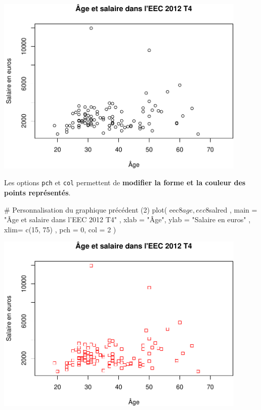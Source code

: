 \documentclass[12pt,twosided, notitlepage]{book}
\newenvironment{Shaded}{}{}
\newcommand{\KeywordTok}[1]{\textcolor[rgb]{0.00,0.00,1.00}{#1}}
\newcommand{\DataTypeTok}[1]{#1}
\newcommand{\DecValTok}[1]{#1}
\newcommand{\StringTok}[1]{\textcolor[rgb]{0.00,0.50,0.50}{#1}}
\newcommand{\CommentTok}[1]{\textcolor[rgb]{0.00,0.50,0.00}{#1}}
\newcommand{\OperatorTok}[1]{#1}
\newcommand{\NormalTok}[1]{#1}
\renewenvironment{Shaded}{\begin{snugshade}}{\end{snugshade}}
\begin{document}
\begin{center}\includegraphics[width=12cm]{livret_files/figure-latex/unnamed-chunk-436-1} \end{center}

Les options \texttt{pch} et \texttt{col} permettent de \textbf{modifier
la forme et la couleur des points représentés}.

\begin{Shaded}
\begin{Highlighting}[]
\CommentTok{# Personnalisation du graphique précédent (2)}
\KeywordTok{plot}\NormalTok{(}
\NormalTok{  eec8}\OperatorTok{$}\NormalTok{age, eec8}\OperatorTok{$}\NormalTok{salred}
\NormalTok{  , }\DataTypeTok{main =} \StringTok{"Âge et salaire dans l'EEC 2012 T4"}
\NormalTok{  , }\DataTypeTok{xlab =} \StringTok{"Âge"}\NormalTok{, }\DataTypeTok{ylab =} \StringTok{"Salaire en euros"}
\NormalTok{  , }\DataTypeTok{xlim=} \KeywordTok{c}\NormalTok{(}\DecValTok{15}\NormalTok{, }\DecValTok{75}\NormalTok{)}
\NormalTok{  , }\DataTypeTok{pch =} \DecValTok{0}\NormalTok{, }\DataTypeTok{col =} \DecValTok{2}
\NormalTok{)}
\end{Highlighting}
\end{Shaded}

\begin{center}\includegraphics[width=12cm]{livret_files/figure-latex/unnamed-chunk-437-1} \end{center}
\end{document}
